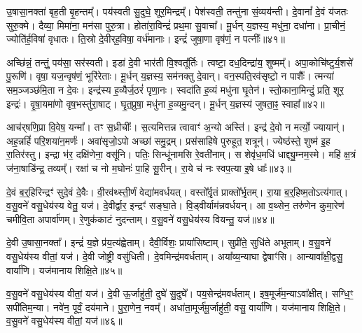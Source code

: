उ॒षासा॒नक्ता॑ बृह॒ती बृ॒हन्तम्᳚।
पय॑स्वती सु॒दुघे॒ शूर॒मिन्द्रम्᳚।
पेश॑स्वती॒ तन्तु॑ना सं॒व्यय॑न्ती।
दे॒वानां᳚ दे॒वं य॑जतः सुरु॒क्मे।
दैव्या॒ मिमा॑ना॒ मन॑सा पुरु॒त्रा।
होता॑रा॒विन्द्रं॑ प्रथ॒मा सु॒वाचा᳚।
मू॒र्धन् य॒ज्ञस्य॒ मधु॑ना॒ दधा॑ना।
प्रा॒चीनं॒ ज्योति॑र्ह॒विषा॑ वृधातः।
ति॒स्रो दे॒वीर्‌\mbox{}ह॒विषा॒ वर्ध॑मानाः।
इन्द्रं॑ जुषा॒णा वृष॑णं॒ न पत्नीः᳚॥४१॥

अच्छि॑न्नं॒ तन्तुं॒ पय॑सा॒ सर॑स्वती।
इडा॑ दे॒वी भार॑ती वि॒श्वतू᳚र्तिः।
त्वष्टा॒ दध॒दिन्द्रा॑य॒ शुष्मम्᳚।
अपा॒कोचि॑ष्टुर्य॒शसे॑ पु॒रूणि॑।
वृषा॒ यज॒न्वृष॑णं॒ भूरि॑रेताः।
मू॒र्धन् य॒ज्ञस्य॒ सम॑नक्तु दे॒वान्।
वन॒स्पति॒रव॑सृष्टो॒ न पाशैः᳚।
त्मन्या॑ सम॒ञ्जञ्छ॑मि॒ता न दे॒वः।
इन्द्र॑स्य ह॒व्यैर्ज॒ठरं॑ पृणा॒नः।
स्वदा॑ति ह॒व्यं मधु॑ना घृ॒तेन॑।
स्तो॒काना॒मिन्दुं॒ प्रति॒ शूर॒ इन्द्रः॑।
वृ॒षा॒यमा॑णो वृष॒भस्तु॑रा॒षाट्।
घृ॒त॒प्रुषा॒ मधु॑ना ह॒व्यमु॒न्दन्।
मू॒र्धन् य॒ज्ञस्य॑ जुषता॒ꣴ॒ स्वाहा᳚॥४२॥\anuvakamend[शर्ध॑मानो॒ महो॑भिः॒ पत्नी᳚र्घृ॒तेन॑ च॒त्वारि॑ च]

आच॑र्‌\mbox{}षणि॒प्रा वि॒वेष॒ यन्मा᳚।
तꣳ स॒ध्रीचीः᳚।
स॒त्यमित्तन्न त्वावाꣳ॑ अ॒न्यो अस्ति॑।
इन्द्र॑ दे॒वो न मर्त्यो॒ ज्यायान्॑।
अह॒न्नहिं॑ परि॒शया॑न॒मर्णः॑।
अवा॑सृजो॒ऽपो अच्छा॑ समु॒द्रम्।
प्रस॑साहिषे पुरुहूत॒ शत्रून्॑।
ज्येष्ठ॑स्ते॒ शुष्म॑ इ॒ह रा॒तिर॑स्तु।
इन्द्रा भ॑र॒ दक्षि॑णेना॒ वसू॑नि।
पतिः॒ सिन्धू॑नामसि रे॒वती॑नाम्।
स शेवृ॑ध॒मधि॑ धाद्द्यु॒म्नम॒स्मे।
महि॑ क्ष॒त्रं ज॑ना॒षाडि॑न्द्र॒ तव्यम्᳚।
रक्षा॑ च नो म॒घोनः॑ पा॒हि सू॒रीन्।
रा॒ये च॑ नः स्वप॒त्या इ॒षे धाः᳚॥४३॥\anuvakamend[रे॒वती॑नां च॒त्वारि॑ च]

दे॒वं ब॒र्॒हिरिन्द्रꣳ॑ सुदे॒वं दे॒वैः।
वी॒रव॑थ्स्ती॒र्णं वेद्या॑मवर्धयत्।
वस्तो᳚र्वृ॒तं प्राक्तो᳚र्भृ॒तम्।
रा॒या ब॒र्॒हिष्म॒तो\-ऽत्य॑गात्।
व॒सु॒वने॑ वसु॒धेय॑स्य वेतु॒ यज॑।
दे॒वीर्द्वार॒ इन्द्रꣳ॑ सङ्घा॒ते।
वि॒ड्वीर्याम॑न्नवर्धयन्।
आ व॒थ्सेन॒ तरु॑णेन कुमा॒रेण॑ चमीवि॒ता अपार्वा॑णम्।
रे॒णुक॑काटं नुदन्ताम्।
व॒सु॒वने॑ वसु॒धेय॑स्य वियन्तु॒ यज॑॥४४॥

दे॒वी उ॒षासा॒नक्ता᳚।
इन्द्रं॑ य॒ज्ञे प्र॑य॒त्य॑ह्वेताम्।
दैवी॒र्विशः॒ प्राया॑सिष्टाम्।
सुप्री॑ते॒ सुधि॑ते अभूताम्।
व॒सु॒वने॑ वसु॒धेय॑स्य वीतां॒ यज॑।
दे॒वी जोष्ट्री॒ वसु॑धिती।
दे॒वमिन्द्र॑मवर्धताम्।
अया᳚व्य॒न्याघा द्वेषाꣳ॑सि।
आन्यावा᳚क्षी॒द्वसु॒ वार्या॑णि।
यज॑मानाय शिक्षि॒ते॥४५॥

व॒सु॒वने॑ वसु॒धेय॑स्य वीतां॒ यज॑।
दे॒वी ऊ॒र्जाहु॑ती॒ दुघे॑ सु॒दुघे᳚।
पय॒सेन्द्र॑मवर्धताम्।
इष॒मूर्ज॑म॒न्या\-ऽवा᳚क्षीत्।
सग्धि॒ꣳ॒ सपी॑तिम॒न्या।
नवे॑न॒ पूर्वं॒ दय॑माने।
पु॒रा॒णेन॒ नवम्᳚।
अधा॑ता॒मूर्ज॑मू॒र्जाहु॑ती॒ वसु॒ वार्या॑णि।
यज॑मानाय शिक्षि॒ते।
व॒सु॒वने॑ वसु॒धेय॑स्य वीतां॒ यज॑॥४६॥

